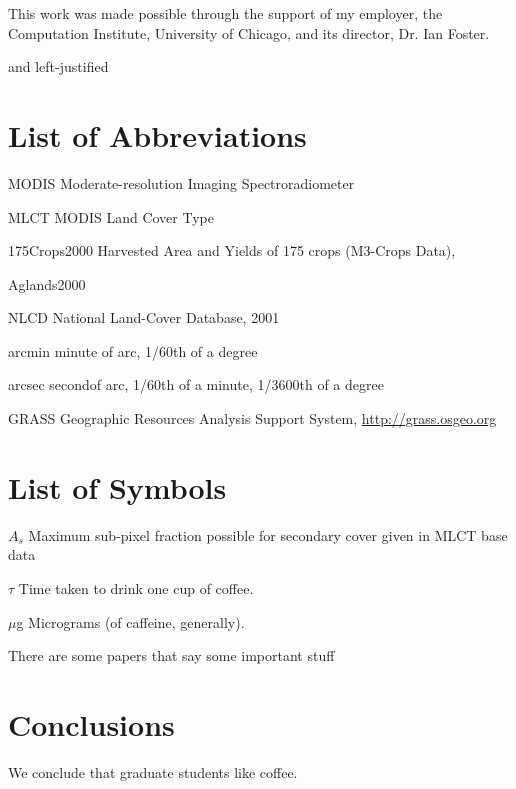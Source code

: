\documentclass[draftthesis]{neiuthesis}
\begin{document}
This work was made possible through the support of my employer, the
Computation Institute, University of Chicago, and its director,
Dr. Ian Foster.


\tableofcontents \listoftables \listoffigures

and left-justified
\chapter{List of Abbreviations}

\begin{symbollist*}
\item[MODIS] Moderate-resolution Imaging Spectroradiometer
\item[MLCT] MODIS Land Cover Type \citep{MLCT}
\item[175Crops2000] Harvested Area and Yields of 175 crops (M3-Crops
Data), \citep{Monfreda2008}
\item[Aglands2000] \citep{Ramankutty2008}
\item [NLCD] National Land-Cover Database, 2001 \citep{Homer2004}
\item[arcmin] minute of arc, 1/60th of a degree
\item[arcsec] secondof arc, 1/60th of a minute, 1/3600th of a degree
\item[GRASS] Geographic Resources Analysis Support System, \url{http://grass.osgeo.org}

\end{symbollist*}

\chapter{List of Symbols}

\begin{symbollist}[0.7in]
\item[$A_s$] Maximum sub-pixel fraction possible for secondary cover
  given in MLCT base data
\item[$\tau$] Time taken to drink one cup of coffee.
\item[$\mu$g] Micrograms (of caffeine, generally).
\end{symbollist}

\mainmatter

There are some papers that say some important stuff
\citep{Ramankutty2008}

\todototoc
\listoftodos





\chapter{Conclusions}

We conclude that graduate students like coffee.

\appendix*

%

\backmatter


\end{document}
